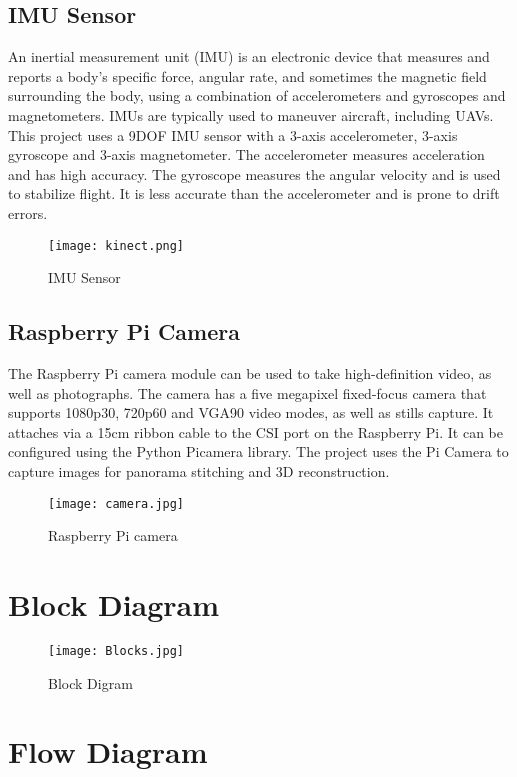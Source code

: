 \subsection{IMU Sensor}
An inertial measurement unit (IMU) is an electronic device that measures and reports a body's specific force, angular rate, and sometimes the magnetic field surrounding the body, using a combination of accelerometers and gyroscopes and magnetometers. IMUs are typically used to maneuver aircraft, including UAVs. This project uses a 9DOF IMU sensor with a 3-axis accelerometer, 3-axis gyroscope and 3-axis magnetometer. The accelerometer measures acceleration and has high accuracy. The gyroscope measures the angular velocity and is used to stabilize flight. It is less accurate than the accelerometer and is prone to drift errors. 
\begin{figure}[H]
  \centering
  \texttt{[image: kinect.png]}
  \caption{IMU Sensor}
  \label{IMU Sensor}	
\end{figure}

\subsection{Raspberry Pi Camera}
The Raspberry Pi camera module can be used to take high-definition video, as well as photographs. The camera has a five megapixel fixed-focus camera that supports 1080p30, 720p60 and VGA90 video modes, as well as stills capture. It attaches via a 15cm ribbon cable to the CSI port on the Raspberry Pi. It can be configured using the Python Picamera library. The project uses the Pi Camera to capture images for panorama stitching and 3D reconstruction.
\begin{figure}[H]
  \centering
  \texttt{[image: camera.jpg]}
  \caption{Raspberry Pi camera}
  \label{RPi camera}	
\end{figure}

\section{Block Diagram}

\begin{figure}[H]
  \centering
  \texttt{[image: Blocks.jpg]}
  \caption{Block Digram}
  \label{block}	
\end{figure}


\section{Flow Diagram}



